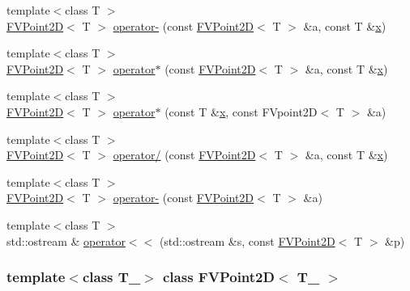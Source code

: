 \begin{DoxyCompactItemize}
\item 
{\footnotesize template$<$class T $>$ }\\\hyperlink{classFVPoint2D}{FVPoint2D}$<$ T $>$ \hyperlink{classFVPoint2D_afe243e86f8ce7b530db3cb29b5eb5445}{operator-\/} (const \hyperlink{classFVPoint2D}{FVPoint2D}$<$ T $>$ \&a, const T \&\hyperlink{classFVPoint2D_a4333b1040efe8cd32f7c76bfc2269e0d}{x})
\item 
{\footnotesize template$<$class T $>$ }\\\hyperlink{classFVPoint2D}{FVPoint2D}$<$ T $>$ \hyperlink{classFVPoint2D_a4bd99f7765dfe89c3d604c9869199e70}{operator$\ast$} (const \hyperlink{classFVPoint2D}{FVPoint2D}$<$ T $>$ \&a, const T \&\hyperlink{classFVPoint2D_a4333b1040efe8cd32f7c76bfc2269e0d}{x})
\item 
{\footnotesize template$<$class T $>$ }\\\hyperlink{classFVPoint2D}{FVPoint2D}$<$ T $>$ \hyperlink{classFVPoint2D_a33ef3d47d5f25efdc6bdf7176e374778}{operator$\ast$} (const T \&\hyperlink{classFVPoint2D_a4333b1040efe8cd32f7c76bfc2269e0d}{x}, const FVpoint2D$<$ T $>$ \&a)
\item 
{\footnotesize template$<$class T $>$ }\\\hyperlink{classFVPoint2D}{FVPoint2D}$<$ T $>$ \hyperlink{classFVPoint2D_a4ae7766bcafa795d446813b5ecfbabad}{operator/} (const \hyperlink{classFVPoint2D}{FVPoint2D}$<$ T $>$ \&a, const T \&\hyperlink{classFVPoint2D_a4333b1040efe8cd32f7c76bfc2269e0d}{x})
\item 
{\footnotesize template$<$class T $>$ }\\\hyperlink{classFVPoint2D}{FVPoint2D}$<$ T $>$ \hyperlink{classFVPoint2D_a209f554d792ea630ece13d82e122f149}{operator-\/} (const \hyperlink{classFVPoint2D}{FVPoint2D}$<$ T $>$ \&a)
\item 
{\footnotesize template$<$class T $>$ }\\std::ostream \& \hyperlink{classFVPoint2D_a1f20f9e0aa6bcd31fbfc819c3d9f1e29}{operator$<$$<$} (std::ostream \&s, const \hyperlink{classFVPoint2D}{FVPoint2D}$<$ T $>$ \&p)
\end{DoxyCompactItemize}
\subsubsection*{template$<$class T\_\-$>$ class FVPoint2D$<$ T\_\- $>$}




